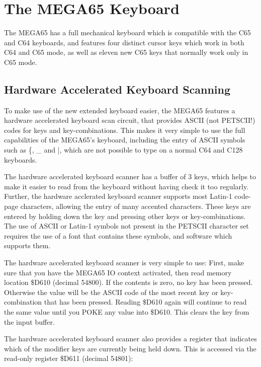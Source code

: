 
\chapter{The MEGA65 Keyboard}

The MEGA65 has a full mechanical keyboard which is compatible with the C65 and
C64 keyboards, and features four distinct cursor keys which work in both C64 and
C65 mode, as well as eleven new C65 keys that normally work only in C65 mode.

\section{Hardware Accelerated Keyboard Scanning}

To make use of the new extended keyboard easier, the MEGA65 features a hardware
accelerated keyboard scan circuit, that provides ASCII (not PETSCII!) codes for
keys and key-combinations.  This makes it very simple to use the full capabilities
of the MEGA65's keyboard, including the entry of ASCII symbols such as \{, \_ and |,
which are not possible to type on a normal C64 and C128 keyboards.

The hardware accelerated keyboard scanner has a buffer of 3 keys, which helps to
make it easier to read from the keyboard without having check it too regularly. 
Further, the hardware acclerated keyboard scanner supports most Latin-1 code-page
characters, allowing the entry of many accented characters.  These keys are
entered by holding down the \megasymbolkey key and pressing other keys or key-combinations.
The use of ASCII or Latin-1 symbols not present in the PETSCII character set
requires the use  of a font that contains these symbols, and software which supports them.

The hardware accelerated keyboard scanner is very simple to use: First, make sure
that you have the MEGA65 IO context activated, then read memory location \$D610
(decimal 54800). If the contents is zero, no key has been pressed.  Otherwise the
value will be the ASCII code of the most recent key or key-combination that has
been pressed.  Reading \$D610 again will continue to read the same value until
you POKE any value into \$D610. This clears the key from the input buffer.

The hardware accelerated keyboard scanner also provides a register that
indicates which of the modifier keys are currently being held down.  This is
accessed via the read-only register \$D611 (decimal 54801):

